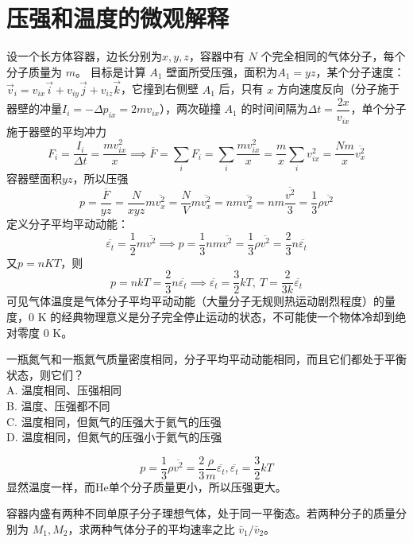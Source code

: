 
\section{压强和温度的微观解释}

\begin{definition}[气体压强的微观来源]
设一个长方体容器，边长分别为$x,y,z$，容器中有 \(N\) 个完全相同的气体分子，每个分子质量为 \(m\)。
目标是计算 \(A_1\) 壁面所受压强，面积为$A_1=yz$，某个分子速度：$\vec v_i=v_{ix}\vec i+v_{iy}\vec j+v_{iz}\vec k$，它撞到右侧壁 \(A_1\) 后，只有 \(x\) 方向速度反向（分子施于器壁的冲量$I_i=-\Delta p_{ix}=2mv_{ix}$），两次碰撞 \(A_1\) 的时间间隔为$\Delta t=\dfrac{2x}{v_{ix}}$，单个分子施于器壁的平均冲力\[F_i=\frac{I_i}{\Delta t}=\frac{mv_{ix}^2}{x}\implies\overline F=\sum_iF_i=\sum_i\frac{mv_{ix}^2}{x}=\frac{m}{x}\sum_i v_{ix}^2=\frac{Nm}{x}\overline{v_x^2}\]容器壁面积$yz$，所以压强\[p=\frac{\overline F}{yz}=\frac{N}{xyz}m\overline{v_x^2}=\frac{N}{V}m\overline{v_x^2}=nm\overline{v_x^2}=nm\frac{\overline{v^2}}{3}=\frac13\rho \overline{v^2}\]定义分子平均平动动能：\[\overline{\varepsilon_t}=\frac12m\overline{v^2}\implies \boxed{p=\frac{1}{3}nm\overline{v^2}=\frac13\rho\overline{v^2}=\frac23n\overline{\varepsilon_t}}\]
又$p=nKT$，则\[p=nkT=\frac23n\overline{\varepsilon_t}\implies\overline{\varepsilon_t}=\frac32kT,~T=\frac{2}{3k}\overline{\varepsilon_t}\]可见气体温度是气体分子平均平动动能（大量分子无规则热运动剧烈程度）的量度，\(0\text{ K}\) 的经典物理意义是分子完全停止运动的状态，不可能使一个物体冷却到绝对零度 \(0\text{ K}\)。
\end{definition}

\begin{exercise}
一瓶氮气和一瓶氦气质量密度相同，分子平均平动动能相同，而且它们都处于平衡状态，则它们？\\
A. 温度相同、压强相同\\
B. 温度、压强都不同\\
C. 温度相同，但氮气的压强大于氦气的压强\\
D. 温度相同，但氮气的压强小于氦气的压强
\end{exercise}
\begin{solution}
\[p=\frac13\rho\overline{v^2}=\frac23\frac{\rho}{m}\overline{\varepsilon_t},\overline{\varepsilon_t}=\frac32kT\]显然温度一样，而He单个分子质量更小，所以压强更大。
\end{solution}

\begin{exercise}
容器内盛有两种不同单原子分子理想气体，处于同一平衡态。若两种分子的质量分别为 \(M_1,M_2\)，求两种气体分子的平均速率之比 \(\bar v_1/\bar v_2\)。
\end{exercise}

